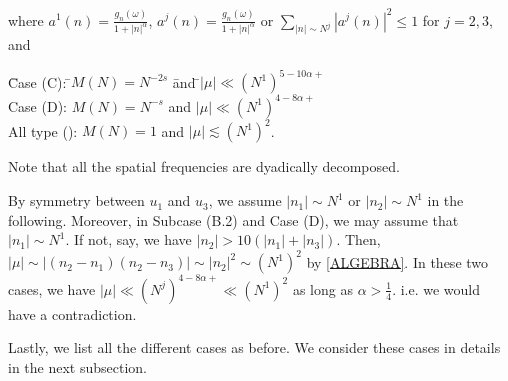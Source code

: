 \documentclass[11pt]{amsart}
\numberwithin{equation}{section} \numberwithin{theorem}{section}
\begin{document}
{
\noindent} where $a^1(n) = \frac{g_{n}(\omega)}{1 + |n|^{\alpha}}$, $a^j(n) = \frac{g_{n}(\omega)}{1 + |n|^{\alpha}}$ or $\sum_{|n| \sim N^j} |a^j(n)|^2 \leq 1$ for $j = 2, 3$, and 
\begin{tabbing}
	\hspace{1cm} \=Case (C): \hspace{1cm}\=$M(N) = N^{-2s} $ \=and \=$|\mu| \ll (N^1)^{5-10{\alpha}+}$ \\
	
	\>Case (D): \>$M(N) = N^{-s}$ \>and \>$|\mu| \ll (N^1)^{4-8{\alpha}+}$\\
	
	\>All type ({\hspace{0.5mm}\hspace{0.5mm}}): \>$M(N) = 1$ \>and \>$|\mu| \lesssim (N^1)^2$.
\end{tabbing}
Note that all the spatial frequencies are dyadically decomposed.

\medskip

By symmetry between $u_1$ and $u_3$, we assume $|n_1| \sim N^1$ or $|n_2| \sim N^1$ in the following. Moreover, in Subcase (B.2) and Case (D), we may assume that $|n_1| \sim N^1$. If not, say, we have $|n_2| > 10 (|n_1| + |n_3|)$. Then, $|\mu| \sim |(n_2 - n_1) (n_2 - n_3)| \sim |n_2|^2 \sim (N^1)^2$ by \eqref{ALGEBRA}. In these two cases, we have $|\mu| \ll (N^j)^{4- 8{\alpha}+} \ll (N^1)^2$ as long as ${\alpha} > \frac{1}{4}$. i.e. we would have a contradiction.

Lastly, we list all the different cases as before.
We consider these cases in details in the next subsection.
\end{document}
